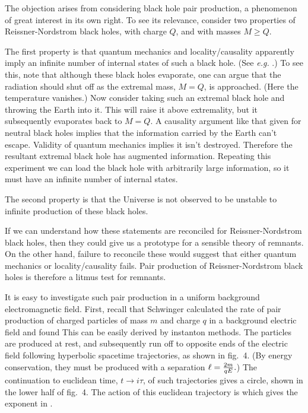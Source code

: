 The objection arises from considering black hole pair production, a
phenomenon of great interest in its own right. To see its relevance,
consider two properties of Reissner-Nordstrom black holes, with charge
${Q}$, and with
masses ${M} {\geq} {Q}$.

The first property is that quantum mechanics and locality/causality
apparently imply an infinite number of internal states of such a black
hole. (See {\it e.g.} .)
To see this, note that although these black holes evaporate, one
can argue that the radiation should shut off as the extremal mass, ${M}
= {Q}$, is approached. (Here the temperature vanishes.)  Now
consider taking such an extremal black hole and
throwing the Earth into it. This will raise it above extremality, but it
subsequently evaporates back to ${M} = {Q}$. A causality argument like
that given for neutral black holes implies that the information carried
by the Earth can't escape. Validity of quantum mechanics implies it
isn't destroyed. Therefore the resultant extremal black hole has
augmented information. Repeating this experiment we can load the black
hole with arbitrarily large information, so it must have an infinite
number of internal states.

The second property is that the Universe is not observed to be unstable
to infinite production of these black holes.

If we can understand how these statements are reconciled for
Reissner-Nordstrom black holes, then they could give us a prototype for
a sensible theory of remnants. On the other hand, failure
to reconcile these would suggest that either quantum mechanics or
locality/causality fails. Pair production of Reissner-Nordstrom black
holes is therefore a litmus test for remnants.


It is easy to investigate such pair production in a uniform background
electromagnetic field. First, recall that Schwinger 
calculated the rate of pair production of charged particles of mass
${m}$ and charge ${q}$ in a background electric field and found
%
\eqn{}
%
This can be easily derived by instanton methods. The particles are
produced at rest, and subsequently run off to opposite ends of the
electric field following hyperbolic spacetime trajectories,
as shown in fig.~4.
(By energy conservation, they must be produced with a separation ${\ell}
= {{2m}\over{qE}}.$) The continuation to euclidean time, ${t}{\rightarrow}{i}
{\tau}$, of such trajectories gives a circle, shown in the lower
half of fig.~4. The action of this euclidean trajectory is
%
\eqn{}
%
which gives the exponent in \prrate.

